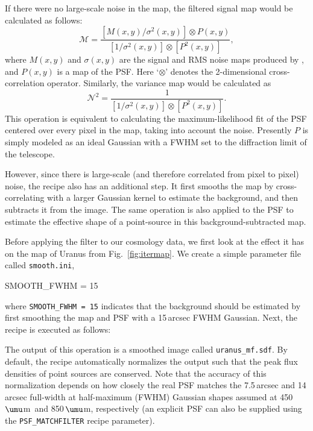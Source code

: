 \documentclass[twoside,11pt]{starlink}
\providecommand{\micron}{\mbox{\,${\umu}$m}}            %
\providecommand{\smurf}{\xref{\textsc{Smurf}}{sun258}{}}
\providecommand{\param}[1]{\texttt{#1}}
\begin{document}
If there were no large-scale noise in the map, the filtered signal map
would be calculated as follows:
%
\begin{equation}
\mathcal{M} = \frac{[M(x,y)/\sigma^2(x,y)] \otimes P(x,y)}
  {[1/\sigma^2(x,y)] \otimes [P^2(x,y)]},
\end{equation}
%
where $M(x,y)$ and $\sigma(x,y)$ are the signal and RMS
noise maps produced by \smurf, and $P(x,y)$ is a map of the
PSF. Here `$\otimes$' denotes the 2-dimensional cross-correlation
operator. Similarly, the variance map would be calculated as
%
\begin{equation}
  \mathcal{N}^2 = \frac{1}{[1/\sigma^2(x,y)] \otimes [P^2(x,y)]}.
\end{equation}
%
This operation is equivalent to calculating the maximum-likelihood fit
of the PSF centered over every pixel in the map, taking into account
the noise. Presently $P$ is simply modeled as an ideal Gaussian
with a FWHM set to the diffraction limit of the telescope.

However, since there is large-scale (and therefore correlated from
pixel to pixel) noise, the recipe also has an additional step. It
first smooths the map by cross-correlating with a larger Gaussian
kernel to estimate the background, and then subtracts it from the
image. The same operation is also applied to the PSF to estimate the
effective shape of a point-source in this background-subtracted map.

Before applying the filter to our cosmology data, we first look at the
effect it has on the map of Uranus from Fig.~\ref{fig:itermap}. We
create a simple parameter file called \texttt{smooth.ini},
\begin{terminalv}
SMOOTH_FWHM = 15
\end{terminalv}
%
where \texttt{SMOOTH\_FWHM = 15} indicates that the background should
be estimated by first smoothing the map and PSF with a 15\,arcsec FWHM
Gaussian. Next, the recipe is executed as follows:
%
\begin{terminalv}
\end{terminalv}
%
The output of this operation is a smoothed image called
\texttt{uranus\_mf.sdf}. By default, the recipe automatically
normalizes the output such that the peak flux densities of point
sources are conserved. Note that the accuracy of this normalization
depends on how closely the real PSF matches the 7.5\,arcsec and
14\,arcsec full-width at half-maximum (FWHM) Gaussian shapes assumed
at 450\micron\ and 850\micron, respectively (an explicit PSF can
also be supplied using the \param{PSF\_MATCHFILTER} recipe
parameter).
\end{document}
